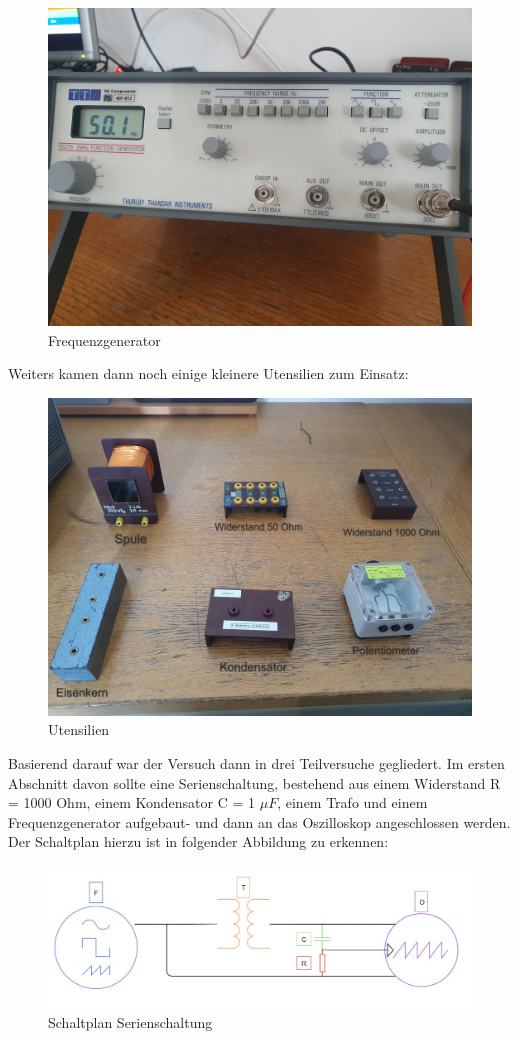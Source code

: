 \documentclass[12pt,a4paper,twoside]{article}
\begin{document}
\begin{figure}[H]
    \centering
    \includegraphics[width=0.6\linewidth, angle=0]{nudes/Frequenzgenerator.jpg}
    \caption{Frequenzgenerator}
    \label{fig:Frequenzgenerator}
\end{figure}

\noindent
Weiters kamen dann noch einige kleinere Utensilien zum Einsatz:

\begin{figure}[H]
    \centering
    \includegraphics[width=0.6\linewidth, angle=0]{nudes/Utensilien.jpg}
    \caption{Utensilien}
    \label{fig:Utensilien}
\end{figure} 

\noindent
Basierend darauf war der Versuch dann in drei Teilversuche gegliedert. Im ersten Abschnitt davon sollte eine Serienschaltung, bestehend aus einem Widerstand R = 1000 Ohm, einem Kondensator C = 1 $\mu F$, einem Trafo und einem Frequenzgenerator aufgebaut- und dann an das Oszilloskop angeschlossen werden.
Der Schaltplan hierzu ist in folgender Abbildung zu erkennen:

\begin{figure}[H]
    \centering
    \includegraphics[width=0.6\linewidth, angle=0]{nudes/Serienschaltung gezeichnet.jpg}
    \caption{Schaltplan Serienschaltung}
    \label{fig:Schaltplan Serienschaltung}
\end{figure}
\end{document}
